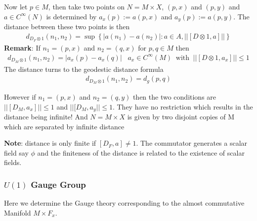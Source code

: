 Now let $p \in M$, then take two points on $N=M\times X$, $(p, x)$ and
$(p,y)$ and $a \in C^\infty(N)$ is determined by $a_x(p):=a(p, x)$ and
$a_y(p):=a(p, y)$. The distance between these two points is then
\begin{align}
    d_{D_F\otimes 1}(n_1, n_2) =  \sup \left\{ |a(n_1) - a(n_2)|: a\in
    A, ||[D\otimes 1, a]||\right\}
\end{align}
\textbf{Remark}: If $n_1 = (p,x)$ and $n_2 = (q, x)$ for $p,q \in M$ then
\begin{align}
    d_{D_M \otimes 1} (n_1, n_2) = |a_x(p) - a_x(q)| \;\;\; a_x\in
    C^\infty(M) \;\; \text{with} \;\; ||[D\otimes 1, a_x]|| \leq 1
\end{align}
The distance turns to the geodestic distance formula
\begin{align}
    d_{D_M\otimes1}(n_1, n_2) = d_g(p, q)
\end{align}

However if $n_1 = (p, x)$ and $n_2 = (q, y)$ then the two conditions are
$||[D_M, a_x]|| \leq 1$ and $||[D_M, a_y|| \leq 1$. They have no
restriction which results in the distance being infinite! And $N =
M\times X$ is given by two disjoint copies of M  which are separated by
infinite distance

\textbf{Note}: distance is only finite if $[D_F, a] \neq 1$. The
commutator
generates a scalar field say $\phi$ and the finiteness of the distance is
related to the existence of scalar fields.
\subsubsection{$U(1)$ Gauge Group}
Here we determine the Gauge theory corresponding to the almost
commutative
Manifold $M\times F_x$.

